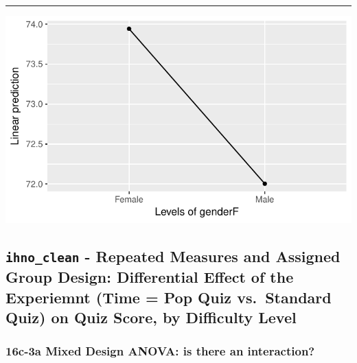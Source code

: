 \documentclass[]{article}
\newenvironment{Shaded}{\begin{snugshade}}{\end{snugshade}}
\newcommand{\KeywordTok}[1]{\textcolor[rgb]{0.13,0.29,0.53}{\textbf{#1}}}
\newcommand{\StringTok}[1]{\textcolor[rgb]{0.31,0.60,0.02}{#1}}
\newcommand{\CommentTok}[1]{\textcolor[rgb]{0.56,0.35,0.01}{\textit{#1}}}
\newcommand{\OperatorTok}[1]{\textcolor[rgb]{0.81,0.36,0.00}{\textbf{#1}}}
\newcommand{\NormalTok}[1]{#1}
\begin{document}
\begin{center}\rule{0.5\linewidth}{\linethickness}\end{center}

\begin{Shaded}
\end{Shaded}

\begin{center}\includegraphics{Unit_5_assignment_KEY_R__spr18__files/figure-latex/unnamed-chunk-88-1} \end{center}

\clearpage

\subsection{\texorpdfstring{\texttt{ihno\_clean} - Repeated Measures and
Assigned Group Design: Differential Effect of the Experiemnt (Time = Pop
Quiz vs.~Standard Quiz) on Quiz Score, by Difficulty
Level}{ihno\_clean - Repeated Measures and Assigned Group Design: Differential Effect of the Experiemnt (Time = Pop Quiz vs.~Standard Quiz) on Quiz Score, by Difficulty Level}}\label{ihno_clean---repeated-measures-and-assigned-group-design-differential-effect-of-the-experiemnt-time-pop-quiz-vs.standard-quiz-on-quiz-score-by-difficulty-level}

\subsubsection{16c-3a Mixed Design ANOVA: is there an
interaction?}\label{c-3a-mixed-design-anova-is-there-an-interaction}
\end{document}

